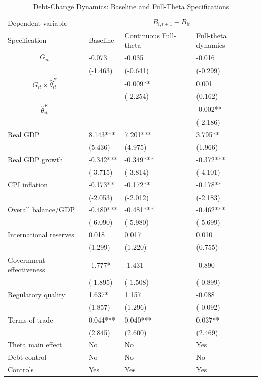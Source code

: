 \begin{table}[H]\centering
\begin{threeparttable}
\caption{Debt-Change Dynamics: Baseline and Full-Theta Specifications}
\label{tab:debt_change_combined_fulltheta}
\scriptsize
\begin{tabularx}{\textwidth}{lYYY}
\toprule
Dependent variable &  \\
\cmidrule(lr){2-4}
Specification & Baseline & Continuous Full-theta & Full-theta dynamics \\
\midrule
$$G_{it}$$ & -0.073 & -0.035 & -0.016 \\
 & (-1.463) & (-0.641) & (-0.299) \\
$$G_{it}\times\widehat{\theta}^{F}_{it}$$ &  & -0.009** & 0.001 \\
 &  & (-2.254) & (0.162) \\
$$\widehat{\theta}^{F}_{it}$$ &  &  & -0.002** \\
 &  &  & (-2.186) \\
Real GDP & 8.143*** & 7.201*** & 3.795** \\
 & (5.436) & (4.975) & (1.966) \\
Real GDP growth & -0.342*** & -0.349*** & -0.372*** \\
 & (-3.715) & (-3.814) & (-4.101) \\
CPI inflation & -0.173** & -0.172** & -0.178** \\
 & (-2.053) & (-2.012) & (-2.183) \\
Overall balance/GDP & -0.480*** & -0.481*** & -0.462*** \\
 & (-6.090) & (-5.980) & (-5.699) \\
International reserves & 0.018 & 0.017 & 0.010 \\
 & (1.299) & (1.220) & (0.755) \\
Government effectiveness & -1.777* & -1.431 & -0.890 \\
 & (-1.895) & (-1.508) & (-0.899) \\
Regulatory quality & 1.637* & 1.157 & -0.088 \\
 & (1.857) & (1.296) & (-0.092) \\
Terms of trade & 0.044*** & 0.040*** & 0.037** \\
 & (2.845) & (2.600) & (2.469) \\
\midrule
Theta main effect & No & No & Yes \\
Debt control & No & No & No \\
Controls & Yes & Yes & Yes \\

\end{tabularx}
\end{threeparttable}
\end{table}
